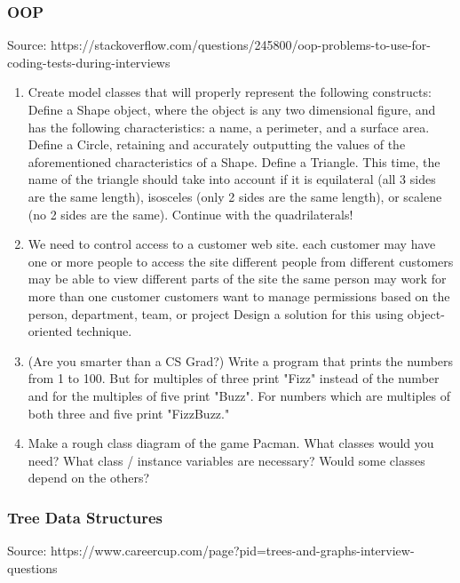 \documentclass[11pt]{article}
\begin{document}
    \subsubsection{OOP}\label{oop}

Source:
https://stackoverflow.com/questions/245800/oop-problems-to-use-for-coding-tests-during-interviews

\begin{enumerate}
\def\labelenumi{\arabic{enumi})}
\item
  Create model classes that will properly represent the following
  constructs: Define a Shape object, where the object is any two
  dimensional figure, and has the following characteristics: a name, a
  perimeter, and a surface area. Define a Circle, retaining and
  accurately outputting the values of the aforementioned characteristics
  of a Shape. Define a Triangle. This time, the name of the triangle
  should take into account if it is equilateral (all 3 sides are the
  same length), isosceles (only 2 sides are the same length), or scalene
  (no 2 sides are the same). Continue with the quadrilaterals!
\item
  We need to control access to a customer web site. each customer may
  have one or more people to access the site different people from
  different customers may be able to view different parts of the site
  the same person may work for more than one customer customers want to
  manage permissions based on the person, department, team, or project
  Design a solution for this using object-oriented technique.
\item
  (Are you smarter than a CS Grad?) Write a program that prints the
  numbers from 1 to 100. But for multiples of three print "Fizz" instead
  of the number and for the multiples of five print "Buzz". For numbers
  which are multiples of both three and five print "FizzBuzz."
\item
  Make a rough class diagram of the game Pacman. What classes would you
  need? What class / instance variables are necessary? Would some
  classes depend on the others?
\end{enumerate}

    \subsubsection{Tree Data Structures}\label{tree-data-structures}

Source:
https://www.careercup.com/page?pid=trees-and-graphs-interview-questions
\end{document}
